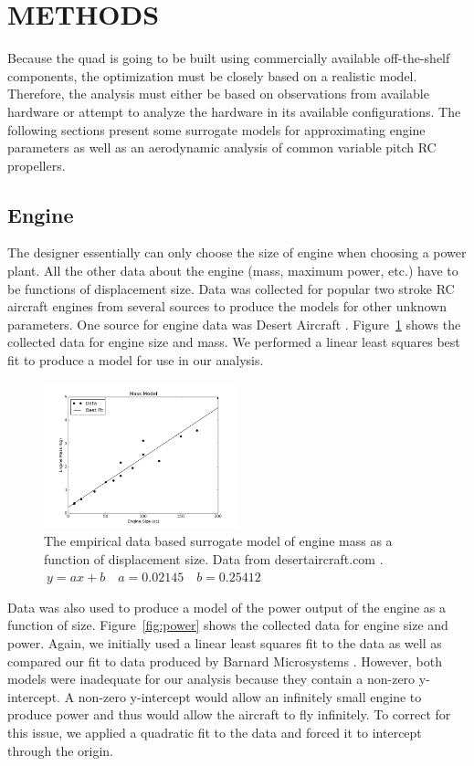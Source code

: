 \documentclass[letterpaper, 10 pt, conference]{ieeeconf}  %
\begin{document}
\section{METHODS}

Because the quad is going to be built using commercially available off-the-shelf components, the optimization must be closely based on a realistic model. Therefore, the analysis must either be based on observations from available hardware or attempt to analyze the hardware in its available configurations.  The following sections present some surrogate models for approximating engine parameters as well as an aerodynamic analysis of common variable pitch RC propellers. 

\subsection{Engine} 

The designer essentially can only choose the size of engine when choosing a power plant. All the other data about the engine (mass, maximum power, etc.) have to be functions of displacement size.  Data was collected for popular two stroke RC aircraft engines from several sources to produce the models for other unknown parameters. One source for engine data was Desert Aircraft \cite{da2016}.  Figure~\ref{fig:mass} shows the collected data for engine size and mass.  We performed a linear least squares best fit to produce a model for use in our analysis.

\begin{figure}
	\includegraphics[width=0.5\textwidth]{mass.png}
	\caption{The empirical data based surrogate model of engine mass as a function of displacement size. Data from desertaircraft.com \cite{da2016}. $\ y = ax + b \quad a = 0.02145 \quad b = 0.25412$}
		\label{fig:mass}
\end{figure}

Data was also used to produce a model of the power output of the engine as a function of size. Figure~\ref{fig:power} shows the collected data for engine size and power.  Again, we initially used a linear least squares fit to the data as well as compared our fit to data produced by Barnard Microsystems \cite{barnardmiro2016}. However, both models were inadequate for our analysis because they contain a non-zero y-intercept.  A non-zero y-intercept would allow an infinitely small engine to produce power and thus would allow the aircraft to fly infinitely. To correct for this issue, we applied a quadratic fit to the data and forced it to intercept through the origin.
\end{document}
